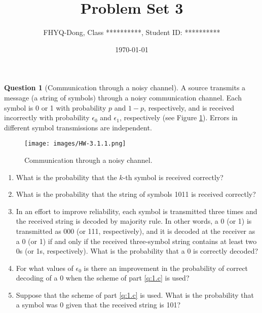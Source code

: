 \documentclass[utf8]{article}
\title{Problem Set 3}
\author{ FHYQ-Dong, Class **********, Student ID: ********** }
\date{\today}
\theoremstyle{definition}%
\newtheorem{question}{Question} %
\theoremstyle{plain}%
\begin{document}
\maketitle
\thispagestyle{fancy}

\begin{question}[Communication through a noisy channel]
    A source transmits a message (a string of symbols) through a noisy communication channel. Each symbol is 0 or 1 with probability $p$ and $1-p$, respectively, and is received incorrectly with probability $\epsilon_0$ and $\epsilon_1$, respectively (see Figure \ref{fig:3.1.1}). Errors in different symbol transmissions are independent.
    \begin{figure}[H]
        \centering
        \texttt{[image: images/HW-3.1.1.png]}
        \caption{Communication through a noisy channel.}
        \label{fig:3.1.1}
    \end{figure}
    \begin{enumerate}[label=(\alph*)]
        \item What is the probability that the $k$-th symbol is received correctly?
        \item What is the probability that the string of symbols 1011 is received correctly?
        \item \label{q:1.c} In an effort to improve reliability, each symbol is transmitted three times and the received string is decoded by majority rule. In other words, a 0 (or 1) is transmitted as 000 (or 111, respectively), and it is decoded at the receiver as a 0 (or 1) if and only if the received three-symbol string contains at least two 0s (or 1s, respectively). What is the probability that a 0 is correctly decoded?
        \item For what values of $\epsilon_0$ is there an improvement in the probability of correct decoding of a 0 when the scheme of part \ref{q:1.c} is used?
        \item Suppose that the scheme of part \ref{q:1.c} is used. What is the probability that a symbol was 0 given that the received string is 101?
    \end{enumerate}
\end{question}
\end{document}
